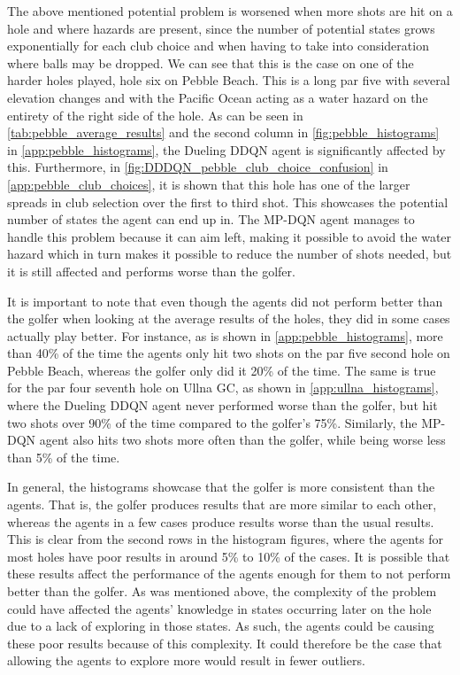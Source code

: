 \documentclass{kththesis}
\begin{document}
The above mentioned potential problem is worsened when more shots are hit on a hole and where hazards are present, since the number of potential states grows exponentially for each club choice and when having to take into consideration where balls may be dropped. We can see that this is the case on one of the harder holes played, hole six on Pebble Beach. This is a long par five with several elevation changes and with the Pacific Ocean acting as a water hazard on the entirety of the right side of the hole. As can be seen in \autoref{tab:pebble_average_results} and the second column in \autoref{fig:pebble_histograms} in \autoref{app:pebble_histograms}, the Dueling DDQN agent is significantly affected by this. Furthermore, in \autoref{fig:DDDQN_pebble_club_choice_confusion} in \autoref{app:pebble_club_choices}, it is shown that this hole has one of the larger spreads in club selection over the first to third shot. This showcases the potential number of states the agent can end up in. The MP-DQN agent manages to handle this problem because it can aim left, making it possible to avoid the water hazard which in turn makes it possible to reduce the number of shots needed, but it is still affected and performs worse than the golfer. 

It is important to note that even though the agents did not perform better than the golfer when looking at the average results of the holes, they did in some cases actually play better. For instance, as is shown in \autoref{app:pebble_histograms}, more than 40\% of the time the agents only hit two shots on the par five second hole on Pebble Beach, whereas the golfer only did it 20\% of the time. The same is true for the par four seventh hole on Ullna GC, as shown in \autoref{app:ullna_histograms}, where the Dueling DDQN agent never performed worse than the golfer, but hit two shots over 90\% of the time compared to the golfer's 75\%. Similarly, the MP-DQN agent also hits two shots more often than the golfer, while being worse less than 5\% of the time. 

In general, the histograms showcase that the golfer is more consistent than the agents. That is, the golfer produces results that are more similar to each other, whereas the agents in a few cases produce results worse than the usual results. This is clear from the second rows in the histogram figures, where the agents for most holes have poor results in around 5\% to 10\% of the cases. It is possible that these results affect the performance of the agents enough for them to not perform better than the golfer. As was mentioned above, the complexity of the problem could have affected the agents' knowledge in states occurring later on the hole due to a lack of exploring in those states. As such, the agents could be causing these poor results because of this complexity. It could therefore be the case that allowing the agents to explore more would result in fewer outliers.
\end{document}
